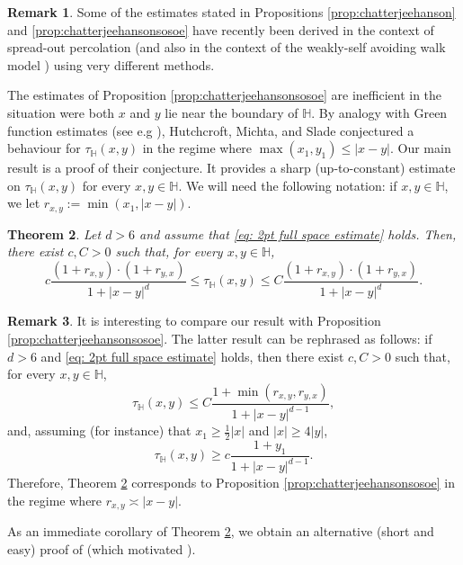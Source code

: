 \documentclass[11pt,a4paper]{article}
\numberwithin{equation}{section}
\theoremstyle{plain}
\newtheorem{Thm}{Theorem}[section]
\theoremstyle{definition}
\newtheorem{Rem}[Thm]{Remark}
\begin{document}
\begin{Rem} Some of the estimates stated in Propositions \ref{prop:chatterjeehanson} and \ref{prop:chatterjeehansonsosoe} have recently been derived in the context of spread-out percolation \cite{DumPan24Perco} (and also in the context of the weakly-self avoiding walk model \cite{DumPan24WSAW}) using very different methods.
\end{Rem}

The estimates of Proposition \ref{prop:chatterjeehansonsosoe} are inefficient in the situation were both $x$ and $y$ lie near the boundary of $\mathbb H$. By analogy with Green function estimates (see e.g \cite{LawlerLimicRandomWalks2010}), Hutchcroft, Michta, and Slade \cite[Remark~3.4]{HutchcroftMichtaSladePercolationTorusPlateau2023} conjectured a behaviour for $\tau_{\mathbb H}(x,y)$ in the regime where $\max(x_1,y_1)\leq|x-y|$. Our main result is a proof of their conjecture. It provides a sharp (up-to-constant) estimate on $\tau_{\mathbb H}(x,y)$ for every $x,y\in \mathbb H$. We will need the following notation: if $x,y\in \mathbb H$, we let $r_{x,y}:=\min(x_1,|x-y|)$.
\begin{Thm} \label{thm:main} Let $d>6$ and assume that \eqref{eq: 2pt full space estimate} holds. Then, there exist $c,C>0$ such that, for every $x,y\in \mathbb H$, \begin{equation} 
c\frac { (1+ r_{x,y}) \cdot (1+ r_{y,x})}{1+ |x-y|^d}\leq \tau_{\mathbb H} (x,y )\leq C\frac { (1+ r_{x,y}) \cdot (1+ r_{y,x})}{1+ |x-y|^d}.
\end{equation}
\end{Thm} 
\begin{Rem} It is interesting to compare our result with Proposition \ref{prop:chatterjeehansonsosoe}. The latter result can be rephrased as follows: if $d>6$ and \eqref{eq: 2pt full space estimate} holds, then there exist $c,C>0$ such that, for every $x,y\in \mathbb H$,
\begin{equation}
	\tau_{\mathbb H}(x,y)\leq C\frac{1+\min(r_{x,y},r_{y,x})}{1+|x-y|^{d-1}},
\end{equation}
and, assuming (for instance) that $x_1\geq \frac{1}{2}|x|$ and $|x|\geq 4|y|$, 
\begin{equation}
		\tau_{\mathbb H}(x,y)\geq c\frac{1+y_1}{1+|x-y|^{d-1}}.
\end{equation}
Therefore, Theorem \ref{thm:main} corresponds to Proposition \ref{prop:chatterjeehansonsosoe} in the regime where $r_{x,y}\asymp |x-y|$.
\end{Rem}
As an immediate corollary of Theorem \ref{thm:main}, we obtain an alternative (short and easy) proof of \cite[Proposition~3.1]{HutchcroftMichtaSladePercolationTorusPlateau2023} (which motivated \cite[Remark~3.4]{HutchcroftMichtaSladePercolationTorusPlateau2023}).
\end{document}
